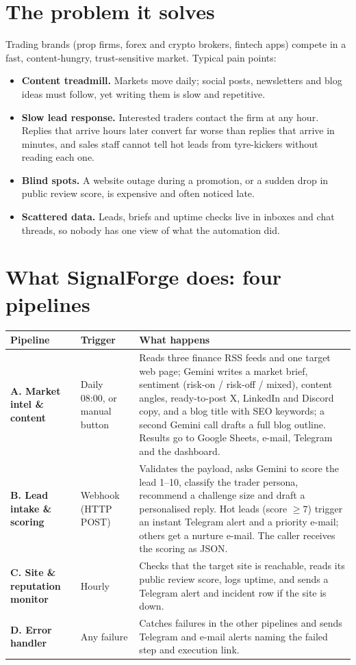 \documentclass[11pt,a4paper]{article}
\begin{document}
\section{The problem it solves}
Trading brands (prop firms, forex and crypto brokers, fintech apps) compete in a fast, content-hungry,
trust-sensitive market. Typical pain points:
\begin{itemize}
  \item \textbf{Content treadmill.} Markets move daily; social posts, newsletters and blog ideas must follow, yet writing them is slow and repetitive.
  \item \textbf{Slow lead response.} Interested traders contact the firm at any hour. Replies that arrive hours later convert far worse than replies that arrive in minutes, and sales staff cannot tell hot leads from tyre-kickers without reading each one.
  \item \textbf{Blind spots.} A website outage during a promotion, or a sudden drop in public review score, is expensive and often noticed late.
  \item \textbf{Scattered data.} Leads, briefs and uptime checks live in inboxes and chat threads, so nobody has one view of what the automation did.
\end{itemize}

\section{What SignalForge does: four pipelines}
\renewcommand{\arraystretch}{1.25}
\begin{tabularx}{\linewidth}{@{}p{2.6cm}p{2.5cm}X@{}}
\toprule
\textbf{Pipeline} & \textbf{Trigger} & \textbf{What happens}\\
\midrule
\textbf{A. Market intel \& content} & Daily 08:00, or manual button &
Reads three finance RSS feeds and one target web page; Gemini writes a market brief, sentiment (risk-on / risk-off / mixed), content angles, ready-to-post X, LinkedIn and Discord copy, and a blog title with SEO keywords; a second Gemini call drafts a full blog outline. Results go to Google Sheets, e-mail, Telegram and the dashboard.\\
\addlinespace
\textbf{B. Lead intake \& scoring} & Webhook (HTTP POST) &
Validates the payload, asks Gemini to score the lead 1--10, classify the trader persona, recommend a challenge size and draft a personalised reply. Hot leads (score $\geq 7$) trigger an instant Telegram alert and a priority e-mail; others get a nurture e-mail. The caller receives the scoring as JSON.\\
\addlinespace
\textbf{C. Site \& reputation monitor} & Hourly &
Checks that the target site is reachable, reads its public review score, logs uptime, and sends a Telegram alert and incident row if the site is down.\\
\addlinespace
\textbf{D. Error handler} & Any failure &
Catches failures in the other pipelines and sends Telegram and e-mail alerts naming the failed step and execution link.\\
\bottomrule
\end{tabularx}
\end{document}
